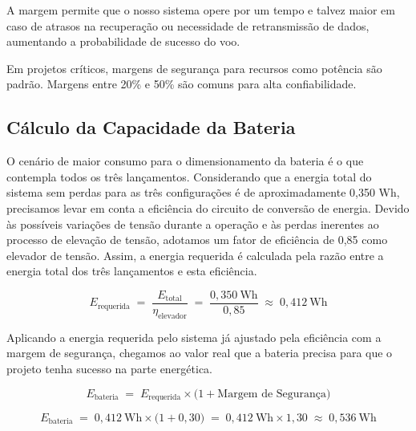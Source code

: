 A margem permite que o nosso sistema opere por um tempo e talvez maior em caso de atrasos na recuperação ou necessidade de retransmissão de dados, aumentando a probabilidade de sucesso do voo. 

Em projetos críticos, margens de segurança para recursos como potência são padrão. \cite{nasa2016} Margens entre 20\% e 50\% são comuns para alta confiabilidade. 


\subsection{Cálculo da Capacidade da Bateria}

O cenário de maior consumo para o dimensionamento da bateria é o que contempla todos os três lançamentos. Considerando que a energia total do sistema sem perdas para as três configurações é de aproximadamente 0,350 Wh, precisamos levar em conta a eficiência do circuito de conversão de energia. Devido às possíveis variações de tensão durante a operação e às perdas inerentes ao processo de elevação de tensão, adotamos um fator de eficiência de 0,85 como elevador de tensão. Assim, a energia requerida é calculada pela razão entre a energia total dos três lançamentos e esta eficiência.

\begin{equation}
E_{\text{requerida}}
\;=\;
\frac{E_{\text{total}}}{\eta_{\text{elevador}}}
\;=\;
\frac{0,350~\mathrm{Wh}}{0,85}
\;\approx\;
0,412~\mathrm{Wh}
\end{equation}

Aplicando a energia requerida pelo sistema já ajustado pela eficiência com a margem de segurança, chegamos ao valor real que a bateria precisa para que o projeto tenha sucesso na parte energética.

\begin{equation}
E_{\text{bateria}}
\;=\;
E_{\text{requerida}}
\times
\bigl(1 + \text{Margem de Segurança}\bigr)
\end{equation}

\begin{equation}
E_{\text{bateria}}
\;=\;
0,412~\mathrm{Wh}
\times
\bigl(1 + 0{,}30\bigr)
\;=\;
0,412~\mathrm{Wh}
\times
1{,}30
\;\approx\;
0,536~\mathrm{Wh}
\end{equation}

